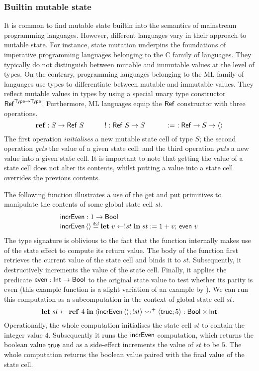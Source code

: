 \documentclass[12pt,phd,lfcs,twoside,openright,logo,leftchapter,normalheadings]{infthesis}
\theoremstyle{plain}
\theoremstyle{definition}
\begin{document}
%
\subsubsection{Builtin mutable state}
It is common to find mutable state builtin into the semantics of
mainstream programming languages. However, different languages vary in
their approach to mutable state. For instance, state mutation
underpins the foundations of imperative programming languages
belonging to the C family of languages. They typically do not
distinguish between mutable and immutable values at the level of
types. On the contrary, programming languages belonging to the ML
family of languages use types to differentiate between mutable and
immutable values. They reflect mutable values in types by using a
special unary type constructor $\mathsf{Ref}^{\mathsf{Type} \to
  \mathsf{Type}}$. Furthermore, ML languages equip the $\mathsf{Ref}$ constructor
with three operations.
%
\[
  \mathbf{ref} : S \to \mathsf{Ref}~S \qquad\quad
  ! : \mathsf{Ref}~S \to S     \qquad\quad
  \mathrel{:=}~ : \mathsf{Ref} \to S \to \langle  \rangle
\]
%
The first operation \emph{initialises} a new mutable state cell of
type $S$; the second operation \emph{gets} the value of a given state
cell; and the third operation \emph{puts} a new value into a given
state cell. It is important to note that getting the value of a state
cell does not alter its contents, whilst putting a value into a state
cell overrides the previous contents.

The following function illustrates a use of the get and put primitives
to manipulate the contents of some global state cell $st$.
%
\[
  \bl
    \incrEven : \UnitType \to \Bool\\
    \incrEven\,\Unit \defas \Let\;v \revto !st\;\In\;st \defnas 1 + v;\,\even~v
  \el
\]
%
The type signature is oblivious to the fact that the function
internally makes use of the state effect to compute its return value.
%
The body of the function first retrieves the current value of the
state cell and binds it to $st$. Subsequently, it destructively
increments the value of the state cell. Finally, it applies the
predicate $\mathsf{even} : \mathsf{Int} \to \mathsf{Bool}$ to the original state value to test
whether its parity is even (this example function is a slight
variation of an example by \citet{Gibbons12}).
%
We can run this computation as a subcomputation in the context of
global state cell $st$.
%
\[
  \mathbf{let}\;st \leftarrow \mathbf{ref}~4\;\mathbf{in}\;\langle \mathsf{incrEven}\,\langle  \rangle;!st \rangle \leadsto^+ \langle \mathsf{true};5 \rangle : \mathsf{Bool} \times \mathsf{Int}
\]
%
Operationally, the whole computation initialises the state cell $st$
to contain the integer value $4$. Subsequently it runs the $\mathsf{incrEven}$
computation, which returns the boolean value $\mathsf{true}$ and as a
side-effect increments the value of $st$ to be $5$. The whole
computation returns the boolean value paired with the final value of
the state cell.
\end{document}
